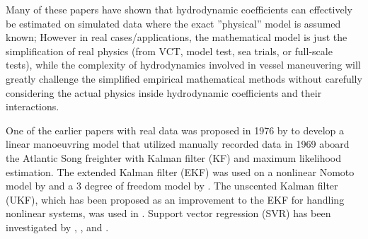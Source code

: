 Many of these papers have shown that hydrodynamic coefficients can effectively be estimated on simulated data where the exact ''physical'' model is assumed known; However in real cases/applications, the mathematical model is just the simplification of real physics (from VCT, model test, sea trials, or full-scale tests), while the complexity of hydrodynamics involved in vessel maneuvering will greatly challenge the simplified empirical mathematical methods without carefully considering the actual physics inside hydrodynamic coefficients and their interactions. 

One of the earlier papers with real data was proposed in 1976 by \citet{astrom_identification_1976} to develop a linear manoeuvring model that utilized manually recorded data in 1969 aboard the Atlantic Song freighter with Kalman filter (KF) and maximum likelihood estimation. 
The extended Kalman filter (EKF) was used on a nonlinear Nomoto model by \citet{perera_system_2015} and a 3 degree of freedom model by \citet{shi_identification_2009}. The unscented Kalman filter (UKF), which has been proposed as an improvement to the EKF for handling nonlinear systems, was used in \citet{revestido_herrero_two-step_2012}.
Support vector regression (SVR) has been investigated by \citet{luo_parameter_2016}, \citet{zhu_parameter_2017}, and \citet{wang_parameter_2021}. 

